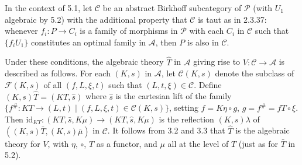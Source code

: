 In the context of 5.1, let $\mathcal{C}$ be an abstract Birkhoff subcategory of $\mathcal{P}$ (with $U_1$ algebraic by 5.2) with the additional property that $\mathcal{C}$ is taut as in 2.3.37: whenever $f_i: P \longrightarrow C_i$ is a family of morphisms in $\mathcal{P}$ with each $C_i$ in $\mathcal{C}$ such that $\{f_i U_1\}$ constitutes an optimal family in $\mathcal{A}$, then $P$ is also in $\mathcal{C}$.

Under these conditions, the algebraic theory $\hat{T}$ in $\mathcal{A}$ giving rise to $V: \mathcal{C} \longrightarrow \mathcal{A}$ is described as follows. For each $(K, s)$ in $\mathcal{A}$, let $\mathcal{C}(K, s)$ denote the subclass of $\mathcal{F}(K, s)$ of all $(f, L, \xi, t)$ such that $(L, t, \xi) \in \mathcal{C}$. Define $(K, s)\hat{T} = (KT, \hat{s})$ where $\hat{s}$ is the cartesian lift of the family $\{f^\#: KT \longrightarrow (L, t) \mid (f, L, \xi, t) \in \mathcal{C}(K, s)\}$, setting $f = K\eta \circ g$, $g = f^\# = fT \circ \xi$. Then $\mathrm{id}_{KT}: (KT, \bar{s}, K\mu) \longrightarrow (KT, \hat{s}, K\mu)$ is the reflection $(K, s)\lambda$ of $((K, s)\bar{T}, (K, s)\bar{\mu})$ in $\mathcal{C}$. It follows from 3.2 and 3.3 that $\hat{T}$ is the algebraic theory for $V$, with $\eta$, $\circ$, $T$ as a functor, and $\mu$ all at the level of $T$ (just as for $\bar{T}$ in 5.2).
